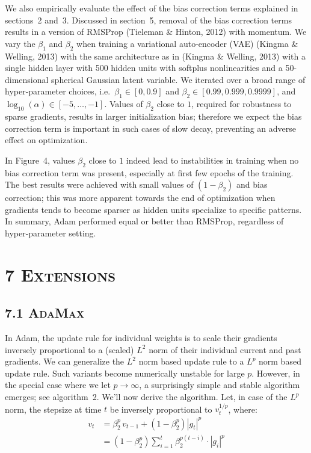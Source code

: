 \documentclass[11pt]{article}
\begin{document}
We also empirically evaluate the effect of the bias correction
terms explained in sections~2 and~3. Discussed in section~5,
removal of the bias correction terms results in a version of
RMSProp (Tieleman \& Hinton, 2012) with momentum. We vary the
$\beta_1$ and $\beta_2$ when training a variational auto-encoder
(VAE) (Kingma \& Welling, 2013) with the same architecture as in
(Kingma \& Welling, 2013) with a single hidden layer with 500
hidden units with softplus nonlinearities and a 50-dimensional
spherical Gaussian latent variable. We iterated over a broad
range of hyper-parameter choices, i.e.\
$\beta_1 \in [0, 0.9]$ and
$\beta_2 \in [0.99, 0.999, 0.9999]$, and
$\log_{10}(\alpha) \in [-5, \ldots, -1]$. Values of $\beta_2$
close to $1$, required for robustness to sparse gradients,
results in larger initialization bias; therefore we expect the
bias correction term is important in such cases of slow decay,
preventing an adverse effect on optimization.

In Figure~4, values $\beta_2$ close to $1$ indeed lead to
instabilities in training when no bias correction term was
present, especially at first few epochs of the training. The
best results were achieved with small values of $(1 - \beta_2)$
and bias correction; this was more apparent towards the end of
optimization when gradients tends to become sparser as hidden
units specialize to specific patterns. In summary, Adam performed
equal or better than RMSProp, regardless of hyper-parameter
setting.

\vspace{0.5em}

\section*{7 \textsc{Extensions}}

\subsection*{7.1 \textsc{AdaMax}}

In Adam, the update rule for individual weights is to scale
their gradients inversely proportional to a (scaled) $L^2$ norm
of their individual current and past gradients. We can
generalize the $L^2$ norm based update rule to a $L^p$ norm
based update rule. Such variants become numerically unstable for
large $p$. However, in the special case where we let
$p \to \infty$, a surprisingly simple and stable algorithm
emerges; see algorithm~2. We'll now derive the algorithm. Let,
in case of the $L^p$ norm, the stepsize at time $t$ be inversely
proportional to $v_t^{1/p}$, where:
%
\begin{align}
v_t &= \beta_2^p \, v_{t-1} + (1 - \beta_2^p) |g_t|^p \\
    &= (1 - \beta_2^p) \sum_{i=1}^{t} \beta_2^{p(t-i)} \cdot |g_i|^p
\end{align}

\end{document}
